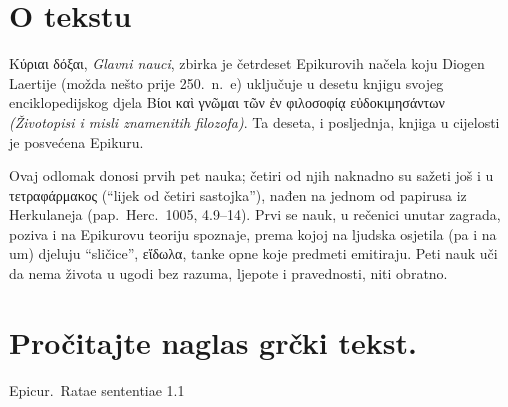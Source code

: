 
\section*{O tekstu}

\textgreek[variant=ancient]{Κύριαι δόξαι,} \textit{Glavni nauci}, zbirka je četrdeset Epikurovih načela koju Diogen Laertije (možda nešto prije 250.\ n.~e) uključuje u desetu knjigu svojeg enciklopedijskog djela \textgreek[variant=ancient]{Βίοι καὶ γνῶμαι τῶν ἐν φιλοσοφίᾳ εὐδοκιμησάντων} \textit{(Životopisi i misli znamenitih filozofa)}. Ta deseta, i posljednja, knjiga u cijelosti je posvećena Epikuru.

Ovaj odlomak donosi prvih pet nauka; četiri od njih naknadno su sažeti još i u τετραφάρμακος (``lijek od četiri sastojka''), nađen na jednom od papirusa iz Herkulaneja (pap.\ Herc.\ 1005, 4.9–14). Prvi se nauk, u rečenici unutar zagrada, poziva i na Epikurovu teoriju spoznaje, prema kojoj na ljudska osjetila (pa i na um) djeluju ``sličice'', εἴδωλα, tanke opne koje predmeti emitiraju. Peti nauk uči da nema života u ugodi bez razuma, ljepote i pravednosti, niti obratno.




\section*{Pročitajte naglas grčki tekst.}

Epicur.\ Ratae sententiae 1.1


\medskip


